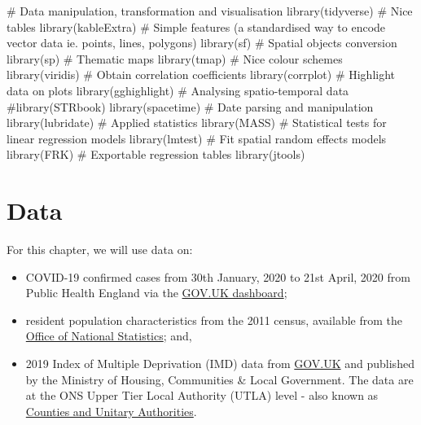 \documentclass[
  letterpaper,
  krantz2]{style/krantz}
\newenvironment{Shaded}{\begin{snugshade}}{\end{snugshade}}
\newcommand{\CommentTok}[1]{\textcolor[rgb]{0.37,0.37,0.37}{#1}}
\newcommand{\FunctionTok}[1]{\textcolor[rgb]{0.28,0.35,0.67}{#1}}
\newcommand{\NormalTok}[1]{\textcolor[rgb]{0.00,0.23,0.31}{#1}}
\begin{document}
\begin{Shaded}
\begin{Highlighting}[]
\CommentTok{\# Data manipulation, transformation and visualisation}
\FunctionTok{library}\NormalTok{(tidyverse)}
\CommentTok{\# Nice tables}
\FunctionTok{library}\NormalTok{(kableExtra)}
\CommentTok{\# Simple features (a standardised way to encode vector data ie. points, lines, polygons)}
\FunctionTok{library}\NormalTok{(sf) }
\CommentTok{\# Spatial objects conversion}
\FunctionTok{library}\NormalTok{(sp) }
\CommentTok{\# Thematic maps}
\FunctionTok{library}\NormalTok{(tmap) }
\CommentTok{\# Nice colour schemes}
\FunctionTok{library}\NormalTok{(viridis) }
\CommentTok{\# Obtain correlation coefficients}
\FunctionTok{library}\NormalTok{(corrplot)}
\CommentTok{\# Highlight data on plots}
\FunctionTok{library}\NormalTok{(gghighlight)}
\CommentTok{\# Analysing spatio{-}temporal data}
\CommentTok{\#library(STRbook)}
\FunctionTok{library}\NormalTok{(spacetime)}
\CommentTok{\# Date parsing and manipulation}
\FunctionTok{library}\NormalTok{(lubridate)}
\CommentTok{\# Applied statistics}
\FunctionTok{library}\NormalTok{(MASS)}
\CommentTok{\# Statistical tests for linear regression models}
\FunctionTok{library}\NormalTok{(lmtest)}
\CommentTok{\# Fit spatial random effects models}
\FunctionTok{library}\NormalTok{(FRK)}
\CommentTok{\# Exportable regression tables}
\FunctionTok{library}\NormalTok{(jtools)}
\end{Highlighting}
\end{Shaded}

\hypertarget{data-6}{%
\section{Data}\label{data-6}}

For this chapter, we will use data on:

\begin{itemize}
\item
  COVID-19 confirmed cases from 30th January, 2020 to 21st April, 2020
  from Public Health England via the
  \href{https://coronavirus.data.gov.uk}{GOV.UK dashboard};
\item
  resident population characteristics from the 2011 census, available
  from the \href{https://www.nomisweb.co.uk/home/census2001.asp}{Office
  of National Statistics}; and,
\item
  2019 Index of Multiple Deprivation (IMD) data from
  \href{https://www.gov.uk/government/statistics/english-indices-of-deprivation-2019}{GOV.UK}
  and published by the Ministry of Housing, Communities \& Local
  Government. The data are at the ONS Upper Tier Local Authority (UTLA)
  level - also known as
  \href{https://geoportal.statistics.gov.uk}{Counties and Unitary
  Authorities}.
\end{itemize}
\end{document}
